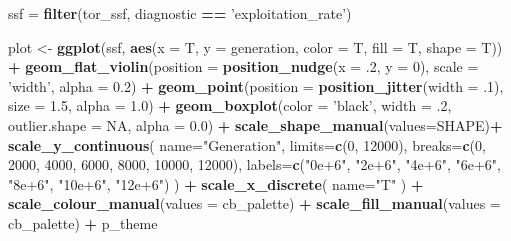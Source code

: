 \documentclass[]{book}
\newenvironment{Shaded}{\begin{snugshade}}{\end{snugshade}}
\newcommand{\DataTypeTok}[1]{\textcolor[rgb]{0.13,0.29,0.53}{#1}}
\newcommand{\DecValTok}[1]{\textcolor[rgb]{0.00,0.00,0.81}{#1}}
\newcommand{\FloatTok}[1]{\textcolor[rgb]{0.00,0.00,0.81}{#1}}
\newcommand{\KeywordTok}[1]{\textcolor[rgb]{0.13,0.29,0.53}{\textbf{#1}}}
\newcommand{\NormalTok}[1]{#1}
\newcommand{\OperatorTok}[1]{\textcolor[rgb]{0.81,0.36,0.00}{\textbf{#1}}}
\newcommand{\OtherTok}[1]{\textcolor[rgb]{0.56,0.35,0.01}{#1}}
\newcommand{\StringTok}[1]{\textcolor[rgb]{0.31,0.60,0.02}{#1}}
\begin{document}
\begin{Shaded}
\begin{Highlighting}[]
\NormalTok{ssf =}\StringTok{ }\KeywordTok{filter}\NormalTok{(tor_ssf, diagnostic }\OperatorTok{==}\StringTok{ 'exploitation_rate'}\NormalTok{)}

\NormalTok{plot <-}\StringTok{ }\KeywordTok{ggplot}\NormalTok{(ssf, }\KeywordTok{aes}\NormalTok{(}\DataTypeTok{x =}\NormalTok{ T, }\DataTypeTok{y =}\NormalTok{ generation, }\DataTypeTok{color =}\NormalTok{ T, }\DataTypeTok{fill =}\NormalTok{ T, }\DataTypeTok{shape =}\NormalTok{ T)) }\OperatorTok{+}
\StringTok{  }\KeywordTok{geom_flat_violin}\NormalTok{(}\DataTypeTok{position =} \KeywordTok{position_nudge}\NormalTok{(}\DataTypeTok{x =} \FloatTok{.2}\NormalTok{, }\DataTypeTok{y =} \DecValTok{0}\NormalTok{), }\DataTypeTok{scale =} \StringTok{'width'}\NormalTok{, }\DataTypeTok{alpha =} \FloatTok{0.2}\NormalTok{) }\OperatorTok{+}
\StringTok{  }\KeywordTok{geom_point}\NormalTok{(}\DataTypeTok{position =} \KeywordTok{position_jitter}\NormalTok{(}\DataTypeTok{width =} \FloatTok{.1}\NormalTok{), }\DataTypeTok{size =} \FloatTok{1.5}\NormalTok{, }\DataTypeTok{alpha =} \FloatTok{1.0}\NormalTok{) }\OperatorTok{+}
\StringTok{  }\KeywordTok{geom_boxplot}\NormalTok{(}\DataTypeTok{color =} \StringTok{'black'}\NormalTok{, }\DataTypeTok{width =} \FloatTok{.2}\NormalTok{, }\DataTypeTok{outlier.shape =} \OtherTok{NA}\NormalTok{, }\DataTypeTok{alpha =} \FloatTok{0.0}\NormalTok{) }\OperatorTok{+}
\StringTok{  }\KeywordTok{scale_shape_manual}\NormalTok{(}\DataTypeTok{values=}\NormalTok{SHAPE)}\OperatorTok{+}
\StringTok{  }\KeywordTok{scale_y_continuous}\NormalTok{(}
    \DataTypeTok{name=}\StringTok{"Generation"}\NormalTok{,}
    \DataTypeTok{limits=}\KeywordTok{c}\NormalTok{(}\DecValTok{0}\NormalTok{, }\DecValTok{12000}\NormalTok{),}
    \DataTypeTok{breaks=}\KeywordTok{c}\NormalTok{(}\DecValTok{0}\NormalTok{, }\DecValTok{2000}\NormalTok{, }\DecValTok{4000}\NormalTok{, }\DecValTok{6000}\NormalTok{, }\DecValTok{8000}\NormalTok{, }\DecValTok{10000}\NormalTok{, }\DecValTok{12000}\NormalTok{),}
    \DataTypeTok{labels=}\KeywordTok{c}\NormalTok{(}\StringTok{"0e+6"}\NormalTok{, }\StringTok{"2e+6"}\NormalTok{, }\StringTok{"4e+6"}\NormalTok{, }\StringTok{"6e+6"}\NormalTok{, }\StringTok{"8e+6"}\NormalTok{, }\StringTok{"10e+6"}\NormalTok{, }\StringTok{"12e+6"}\NormalTok{)}
\NormalTok{  ) }\OperatorTok{+}
\StringTok{  }\KeywordTok{scale_x_discrete}\NormalTok{(}
    \DataTypeTok{name=}\StringTok{"T"}
\NormalTok{  ) }\OperatorTok{+}
\StringTok{  }\KeywordTok{scale_colour_manual}\NormalTok{(}\DataTypeTok{values =}\NormalTok{ cb_palette) }\OperatorTok{+}
\StringTok{  }\KeywordTok{scale_fill_manual}\NormalTok{(}\DataTypeTok{values =}\NormalTok{ cb_palette) }\OperatorTok{+}
\StringTok{  }\NormalTok{p_theme}


\end{Highlighting}
\end{Shaded}
\end{document}
